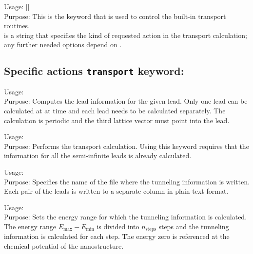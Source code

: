 {
  \noindent
  Usage:   []\\[1.0ex] 
  Purpose: This is the keyword that is used to
  control the built-in transport routines. \\[1.0ex] 
   is a string that specifies the kind of requested action in the
  transport calculation; any further needed options depend on
  . \\ }

\subsection*{Specific actions \texttt{transport} keyword:}

{
  \noindent
  Usage:   \\[1.0ex]
  Purpose: Computes the lead information for the given lead. Only one
  lead can be calculated at at time and each lead needs to be
  calculated separately.  The calculation is periodic and the third
  lattice vector must point into the lead.}

{
  \noindent
  Usage:   \\[1.0ex]
  Purpose: Performs the transport calculation. Using this keyword
  requires that the information for all the semi-infinite leads is
  already calculated.  }

{
  \noindent
  Usage:    \\[1.0ex]
  Purpose: Specifies the name of the file where the tunneling
  information is written. Each pair of the leads is written to a separate
  column in plain text format.}

{
  \noindent
  Usage:      \\[1.0ex]
  Purpose: Sets the energy range for which the tunneling information
  is calculated. The energy range $E_\mathrm{max} - E_\mathrm{min}$ is
  divided into $n_\mathrm{steps}$ steps and the tunneling information
  is calculated for each step. The energy zero is referenced at the
  chemical potential of the nanostructure.}

